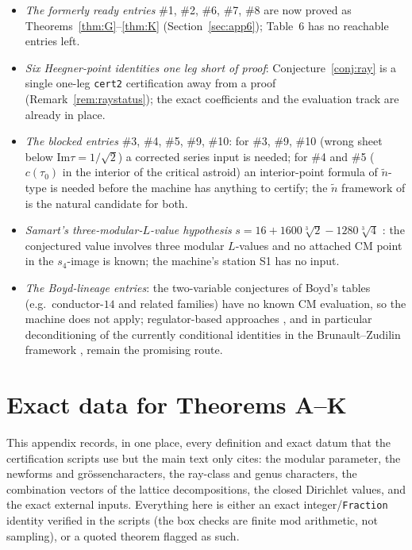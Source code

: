 \documentclass[11pt]{article}
\newcommand{\ImT}{\mathrm{Im}}
\theoremstyle{definition}
\theoremstyle{remark}
\begin{document}
\begin{itemize}
\item \emph{The formerly ready entries} \#1, \#2, \#6, \#7, \#8 are
  now proved as Theorems~\ref{thm:G}--\ref{thm:K}
  (Section~\ref{sec:app6}); Table~6 has no reachable entries left.
\item \emph{Six Heegner-point identities one leg short of proof}:
  Conjecture~\ref{conj:ray} is a single one-leg \texttt{cert2}
  certification away from a proof (Remark~\ref{rem:raystatus}); the
  exact coefficients and the evaluation track are already in place.
\item \emph{The blocked entries} \#3, \#4, \#5, \#9, \#10: for \#3,
  \#9, \#10 (wrong sheet below $\ImT\tau=1/\sqrt2$) a corrected
  series input is needed; for \#4 and \#5 ($c(\tau_0)$ in the
  interior of the critical astroid) an interior-point formula of
  $\widetilde n$-type is needed before the machine has anything to
  certify; the $\widetilde n$ framework of \cite{ST} is the natural
  candidate for both.
\item \emph{Samart's three-modular-$L$-value hypothesis}
  $s=16+1600\sqrt[3]2-1280\sqrt[3]4$ \cite{Sa15}: the conjectured
  value involves three modular $L$-values and no attached CM point in
  the $s_4$-image is known; the machine's station S1 has no input.
\item \emph{The Boyd-lineage entries}: the two-variable
  conjectures of Boyd's tables (e.g.\ conductor-$14$ and related
  families) have no known CM evaluation, so the machine does not
  apply; regulator-based approaches \cite{De,BZ}, and in particular
  deconditioning of the currently conditional identities in the
  Brunault--Zudilin framework \cite{BZ}, remain the promising route.
\end{itemize}

\appendix
\section{Exact data for Theorems A--K}\label{app:data}

This appendix records, in one place, every definition and exact datum
that the certification scripts use but the main text only cites: the
modular parameter, the newforms and grössencharacters, the ray-class
and genus characters, the combination vectors of the lattice
decompositions, the closed Dirichlet values, and the exact external
inputs. Everything here is either an exact integer/\texttt{Fraction}
identity verified in the scripts (the box checks are finite mod
arithmetic, not sampling), or a quoted theorem flagged as such.
\end{document}

